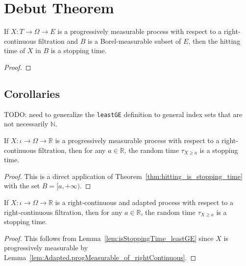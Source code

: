 \chapter{Debut Theorem}
\label{chap:debut_theorem}


\begin{theorem}\label{thm:hitting_is_stopping_time}
  \notready
If $X : T \to \Omega \to E$ is a progressively measurable process with respect to a right-continuous filtration and $B$ is a Borel-measurable subset of $E$, then the hitting time of $X$ in $B$ is a stopping time.
\end{theorem}

\begin{proof}

\end{proof}


\section{Corollaries}

TODO: need to generalize the \texttt{leastGE} definition to general index sets that are not necessarily $\mathbb{N}$.




\begin{lemma}\label{lem:isStoppingTime_leastGE}
If $X : ι \to Ω \to ℝ$ is a progressively measurable process with respect to a right-continuous filtration, then for any $a \in \mathbb{R}$, the random time $\tau_{X \ge a}$ is a stopping time.
\end{lemma}

\begin{proof}
This is a direct application of Theorem~\ref{thm:hitting_is_stopping_time} with the set $B = [a, +\infty)$.
\end{proof}


\begin{corollary}\label{cor:isStoppingTime_leastGE_of_rightContinuous}
If $X : ι \to Ω \to ℝ$ is a right-continuous and adapted process with respect to a right-continuous filtration, then for any $a \in \mathbb{R}$, the random time $\tau_{X \ge a}$ is a stopping time.
\end{corollary}

\begin{proof}
This follows from Lemma~\ref{lem:isStoppingTime_leastGE} since $X$ is progressively measurable by Lemma~\ref{lem:Adapted.progMeasurable_of_rightContinuous}.
\end{proof}
